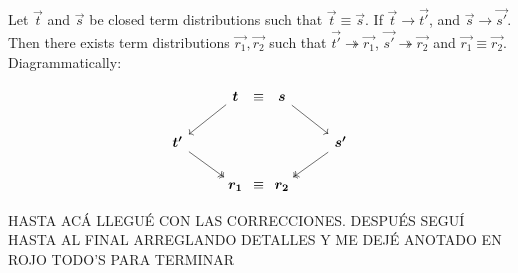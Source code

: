 \documentclass[runningheads,orivec]{llncs}
\def\evalone{\rightarrow}
\def\eval{\twoheadrightarrow}
\begin{document}
\begin{theorem}
  Let $\vec{t}$ and $\vec{s}$ be closed term distributions such that $\vec{t}\equiv\vec{s}$. If $\vec{t}\evalone\vec{t'}$, and $\vec{s}\evalone\vec{s'}$. Then there exists term distributions $\vec{r_1},\vec{r_2}$ such that $\vec{t'}\eval\vec{r_1}$, $\vec{s'}\eval\vec{r_2}$ and $\vec{r_1}\equiv\vec{r_2}$. Diagrammatically:

\[
  \begin{tikzcd}
   & \vec{t} \arrow[ld]&[-2.5em] \equiv &[-2.5em] \vec{s}\arrow[rd] &\\
   \vec{t'}\arrow[dr, twoheadrightarrow] & & & & \vec{s'}\arrow[ld, twoheadrightarrow] \\
   & \vec{r_1} & \equiv & \vec{r_2} &
  \end{tikzcd}
\]
\end{theorem}

{\color{red} HASTA ACÁ LLEGUÉ CON LAS CORRECCIONES. DESPUÉS SEGUÍ HASTA AL FINAL ARREGLANDO DETALLES Y ME DEJÉ ANOTADO EN ROJO TODO'S PARA TERMINAR}
\end{document}
